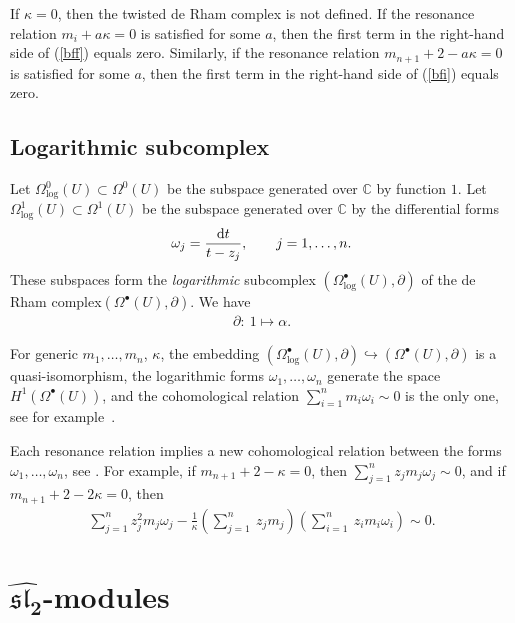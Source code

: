 If $\kappa=0$, then the twisted de Rham complex is not defined. If the resonance relation \mbox{$m_i+a\kappa=0$} is satisfied for some $a$, then the first term in the right-hand side of (\ref{bff}) equals zero. Similarly, if the resonance relation $m_{n+1}+2-a\kappa=0$ is satisfied for some $a$, then the first term in the right-hand side of (\ref{bfi}) equals zero.

\subsection{Logarithmic subcomplex} \label{log forms}
Let $\Omega_{\log}^0(U) \subset \Omega^0(U)$ be the subspace generated over ${\mathbb C}$ by function $1$. Let $\Omega_{\log}^1(U) \subset \Omega^1(U)$ be the subspace generated over ${\mathbb C}$ by the differential forms
\begin{gather*}
\omega_j=\frac{{\rm d}t}{t-z_j}, \qquad j=1,\dots,n.
\end{gather*}
These subspaces form the {\it logarithmic} subcomplex $(\Omega^\bullet_{\log}(U), \partial)$ of the de Rham complex\linebreak $(\Omega^\bullet(U), \partial)$. We have
\begin{gather*}
\partial\colon \ 1 \mapsto \alpha.
\end{gather*}

For generic $m_1,\dots, m_n$, $\kappa$, the embedding $(\Omega^\bullet_{\log}(U), \partial)\hookrightarrow (\Omega^\bullet(U), \partial)$ is a quasi-isomorphism, the logarithmic forms $\omega_1,\dots,\omega_n$ generate the space $H^1(\Omega^\bullet(U))$, and the cohomological relation $\sum\limits_{i=1}^n m_i \omega_i\sim 0$ is the only one, see for example~\cite{STV}.

Each resonance relation implies a new cohomological relation between the forms $\omega_1,\dots,\omega_n$, see \cite[Corollary 6.4]{SV2}. For example, if $m_{n+1}+2-\kappa=0$, then $\sum\limits_{j=1}^n z_j m_j\omega_j \sim 0$, and if $m_{n+1}+2-2\kappa=0$, then
\begin{gather*}
\sum_{j=1}^n z_j^2m_j\omega_j-\frac{1}{\kappa}\left(\sum_{j=1}^n\ z_jm_j\right)\left(\sum_{i=1}^n\ z_im_i\omega_i\right)\sim 0.
\end{gather*}

\section[$\widehat{{\mathfrak{sl}_2}}$-modules]{$\boldsymbol{\widehat{{\mathfrak{sl}_2}}}$-modules} \label{sec hsl}
